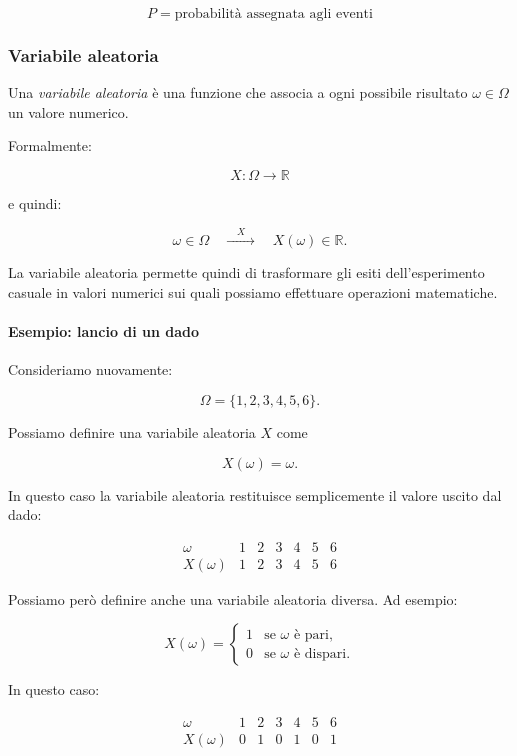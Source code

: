 $$
\boxed{
P=\text{probabilità assegnata agli eventi}
}
$$

\subsubsection*{Variabile aleatoria}

Una \emph{variabile aleatoria} è una funzione che associa a ogni possibile risultato $\omega\in\Omega$ un valore numerico.

Formalmente:

$$
\boxed{X:\Omega\rightarrow\mathbb{R}}
$$

e quindi:

$$
\omega\in\Omega
\quad\xrightarrow{\quad X\quad}\quad
X(\omega)\in\mathbb{R}.
$$

La variabile aleatoria permette quindi di trasformare gli esiti dell'esperimento casuale in valori numerici sui quali possiamo effettuare operazioni matematiche.

\paragraph{Esempio: lancio di un dado}

Consideriamo nuovamente:

$$
\Omega=\{1,2,3,4,5,6\}.
$$

Possiamo definire una variabile aleatoria $X$ come

$$
X(\omega)=\omega.
$$

In questo caso la variabile aleatoria restituisce semplicemente il valore uscito dal dado:

$$
\begin{array}{c|cccccc}
\omega & 1 & 2 & 3 & 4 & 5 & 6\\
\hline
X(\omega) & 1 & 2 & 3 & 4 & 5 & 6
\end{array}
$$

Possiamo però definire anche una variabile aleatoria diversa. Ad esempio:

$$
X(\omega)=
\begin{cases}
1 & \text{se }\omega\text{ è pari},\\
0 & \text{se }\omega\text{ è dispari}.
\end{cases}
$$

In questo caso:

$$
\begin{array}{c|cccccc}
\omega & 1 & 2 & 3 & 4 & 5 & 6\\
\hline
X(\omega) & 0 & 1 & 0 & 1 & 0 & 1
\end{array}
$$

